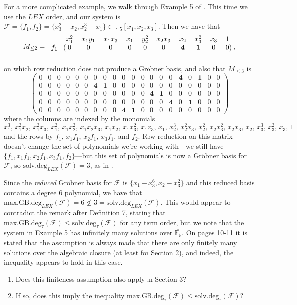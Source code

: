 \documentclass[12pt]{article}
\newcommand{\F}{\mathcal{F}}
\newcommand{\sdeg}{\text{solv.deg}}
\newcommand{\mdeg}{\text{max.GB.deg}}
\begin{document}
\noindent For a more complicated example, we walk through Example 5 of \cite{caminata2020solving}. This time we use the $LEX$ order, and our system is $\F = \{f_1, f_2\} = \{x_3^2 - x_2, x_2^3 - x_1\} \subset \mathbb{F}_5[x_1, x_2, x_3]$. Then we have that \[ M_{\leq 2} = \begin{blockarray}{ccccccccccc}
    & x_1^2 & x_1y_1 & x_1x_3 & x_1 & y_2^2 & x_2x_3 & x_2 & x_3^2 & x_3 & 1 \\
    \begin{block}{c(cccccccccc)}
        f_1 & 0 & 0 & 0 & 0 & 0 & 0 & \mathbf{4} & \mathbf{1} & 0 & 0 \\
    \end{block}
\end{blockarray}, \] on which row reduction does not produce a Gröbner basis, and also that $M_{\leq 3}$ is \[ \begin{pmatrix}
	0 & 0 & 0 & 0 & 0 & 0 & 0 & 0 & 0 & 0 & 0 & 0 & 0 & 0 & 0 & \mathbf{4} & 0 & \mathbf{1} & 0 & 0 \\
	0 & 0 & 0 & 0 & 0 & 0 & \mathbf{4} & \mathbf{1} & 0 & 0 & 0 & 0 & 0 & 0 & 0 & 0 & 0 & 0 & 0 & 0 \\
	0 & 0 & 0 & 0 & 0 & 0 & 0 & 0 & 0 & 0 & 0 & 0 & \mathbf{4} & \mathbf{1} & 0 & 0 & 0 & 0 & 0 & 0 \\
	0 & 0 & 0 & 0 & 0 & 0 & 0 & 0 & 0 & 0 & 0 & 0 & 0 & 0 & \mathbf{4} & 0 & \mathbf{1} & 0 & 0 & 0 \\
	0 & 0 & 0 & 0 & 0 & 0 & 0 & 0 & 0 & \mathbf{4} & \mathbf{1} & 0 & 0 & 0 & 0 & 0 & 0 & 0 & 0 & 0 
\end{pmatrix} \] where the columns are indexed by the monomials \[ x_1^3, \, x_1^2x_2, \, x_1^2x_3, \, x_1^2, \, x_1x_2^2, \, x_1x_2x_3, \, x_1x_2, \, x_1x_3^2, \, x_1x_3, \, x_1, \, x_2^3, \, x_2^2x_3, \, x_2^2, \, x_2x_3^2, \, x_2x_3, \, x_2, \, x_3^3, \, x_3^2, \, x_3, \, 1 \] and the rows by $f_1$, $x_1f_1$, $x_2f_1$, $x_3f_1$, and $f_2$. Row reduction on this matrix doesn't change the set of polynomials we're working with---we still have $\{f_1, x_1f_1, x_2f_1, x_3f_1, f_2\}$---but this set of polynomials is now a Gr\"obner basis for $\F$, so $\sdeg_{LEX}(\F) = 3$, as in \cite{caminata2020solving}. 

Since the \emph{reduced} Gr\"obner basis for $\F$ is $\{x_1 - x_3^6, x_2 - x_3^2\}$ and this reduced basis contains a degree 6 polynomial, we have that $\mdeg_{LEX}(\F) = 6 \not \leq 3 = \sdeg_{LEX}(\F)$. This would appear to contradict the remark after Definition 7, stating that $\mdeg_\tau(\F) \leq \sdeg_\tau(\F)$ for any term order, but we note that the system in Example 5 has infinitely many solutions over $\overline{\mathbb{F}_5}$. On pages 10-11 it is stated that the assumption is always made that there are only finitely many solutions over the algebraic closure (at least for Section 2), and indeed, the inequality appears to hold in this case.

\begin{enumerate}
	\item Does this finiteness assumption also apply in Section 3?
	\item If so, does this imply the inequality $\mdeg_\tau(\F) \leq \sdeg_\tau(\F)$?
\end{enumerate}









\newpage


\end{document}
